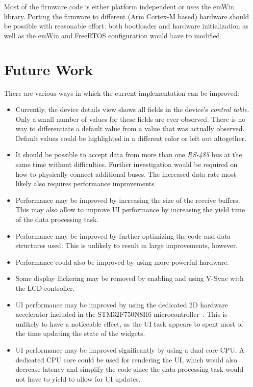 Most of the firmware code is either platform independent or uses the emWin library. Porting the
firmware to different (Arm Cortex-M based) hardware should be possible with reasonable effort: both
bootloader and hardware initialization as well as the emWin and FreeRTOS configuration would have to
modified.

\section{Future Work}
\label{conclusion-and-future-work/future-work}

There are various ways in which the current implementation can be improved:

\begin{itemize}
    \item Currently, the device details view shows all fields in the device's \textit{control table}.
          Only a small number of values for these fields are ever observed. There is no way to
          differentiate a default value from a value that was actually observed. Default values could
          be highlighted in a different color or left out altogether.
    \item It should be possible to accept data from more than one \textit{RS-485} bus at the same time
          without difficulties. Further investigation would be required on how to physically connect
          additional buses. The increased data rate most likely also requires performance improvements.
    \item Performance may be improved by increasing the size of the receive buffers. This may also
          allow to improve UI performance by increasing the yield time of the data processing task.
    \item Performance may be improved by further optimizing the code and data structures used. This
          is unlikely to result in large improvements, however.
    \item Performance could also be improved by using more powerful hardware.
    \item Some display flickering may be removed by enabling and using V-Sync with the LCD controller.
    \item UI performance may be improved by using the dedicated 2D hardware accelerator included in
          the STM32F750N8H6 microcontroller~\cite{mcu-ref-manual}. This is unlikely to have a noticeable
          effect, as the UI task appears to spent most of the time updating the state of the widgets.
    \item UI performance may be improved significantly by using a dual core CPU. A dedicated CPU core
          could be used for rendering the UI, which would also decrease latency and simplify the
          code since the data processing task would not have to yield to allow for UI updates.
\end{itemize}
